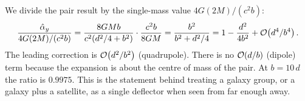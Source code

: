 \begin{derivation}
We divide the pair result by the single-mass value $4G(2M)/(c^2b)$:
\[
\frac{\hat\alpha_y}{4G(2M)/(c^2b)} = \frac{8GMb}{c^2(d^2/4 + b^2)}\cdot\frac{c^2b}{8GM}
= \frac{b^2}{b^2 + d^2/4} = 1 - \frac{d^2}{4b^2} + \mathcal{O}\!\left(d^4/b^4\right) .
\]
The leading correction is $\mathcal{O}\!\left(d^2/b^2\right)$ (quadrupole).  There is no
$\mathcal{O}\!\left(d/b\right)$ (dipole) term because the expansion is about the centre of mass
of the pair.  At $b = 10\,d$ the ratio is $0.9975$.  This is the
statement behind treating a galaxy group, or a galaxy plus a satellite, as
a single deflector when seen from far enough away.
\end{derivation}

